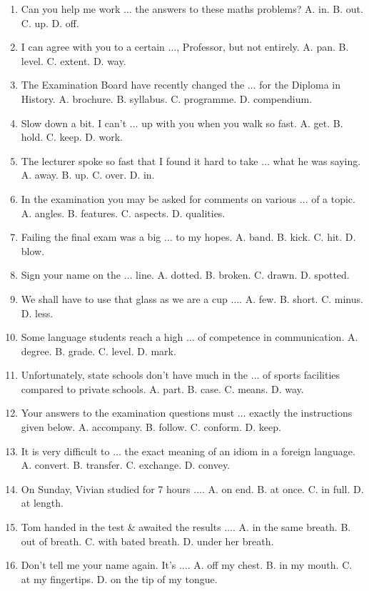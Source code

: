 \documentclass{article}
\numberwithin{equation}{section}
\begin{document}
\begin{enumerate}[leftmargin=2mm]
	\item Can you help me work $\ldots$ the answers to these maths problems? A. in. B. out. C. up. D. off.
	\item I can agree with you to a certain $\ldots$, Professor, but not entirely. A. pan. B. level. C. extent. D. way.
	\item The Examination Board have recently changed the $\ldots$ for the Diploma in History. A. brochure. B. syllabus. C. programme. D. compendium.
	\item Slow down a bit. I can't $\ldots$ up with you when you walk so fast. A. get. B. hold. C. keep. D. work.
	\item The lecturer spoke so fast that I found it hard to take $\ldots$ what he was saying. A. away. B. up. C. over. D. in.
	\item In the examination you may be asked for comments on various $\ldots$ of a topic. A. angles. B. features. C. aspects. D. qualities.
	\item Failing the final exam was a big $\ldots$ to my hopes. A. band. B. kick. C. hit. D. blow.
	\item Sign your name on the $\ldots$ line. A. dotted. B. broken. C. drawn. D. spotted.
	\item We shall have to use that glass as we are a cup $\ldots$. A. few. B. short. C. minus. D. less.
	\item Some language students reach a high $\ldots$ of competence in communication. A. degree. B. grade. C. level. D. mark.
	\item Unfortunately, state schools don't have much in the $\ldots$ of sports facilities compared to private schools. A. part. B. case. C. means. D. way.
	\item Your answers to the examination questions must $\ldots$ exactly the instructions given below. A. accompany. B. follow. C. conform. D. keep.
	\item It is very difficult to $\ldots$ the exact meaning of an idiom in a foreign language. A. convert. B. transfer. C. exchange. D. convey.
	\item On Sunday, Vivian studied for 7 hours $\ldots$. A. on end. B. at once. C. in full. D. at length.
	\item Tom handed in the test \& awaited the results $\ldots$. A. in the same breath. B. out of breath. C. with bated breath. D. under her breath.
	\item Don't tell me your name again. It's $\ldots$. A. off my chest. B. in my mouth. C. at my fingertips. D. on the tip of my tongue.

\end{enumerate}
\end{document}
